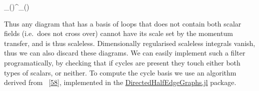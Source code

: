 \documentclass[
  10pt,
  a4paper,
  DIV=11,
  numbers=noendperiod,
  twoside]{scrreprt}
\let\[\relax \let\]\relax %
\DeclareRobustCommand{\[}{\begin{equation}}
\DeclareRobustCommand{\]}{\end{equation}}
\begin{document}
\[
_()\lambda^\eta {}_()
\]

Thus any diagram that has a basis of loops that does not contain both
scalar fields (i.e.~does not cross over) cannot have its scale set by
the momentum transfer, and is thus scaleless. Dimensionally regularised
scaleless integrals vanish, thus we can also discard these diagrams. We
can easily implement such a filter programatically, by checking that if
cycles are present they touch either both types of scalars, or neither.
To compute the cycle basis we use an algorithm derived from
~{[}\protect\hyperlink{ref-Paton:1969}{58}{]}, implemented in the
\href{https://github.com/lcnhb/DirectedHalfEdgeGraphs.jl}{DirectedHalfEdgeGraphs.jl}
package.
\end{document}
